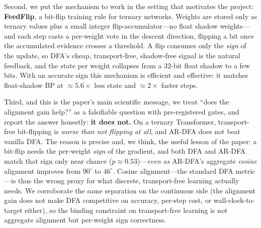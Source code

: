 \documentclass[11pt]{article}
\newcommand{\ARDFA}{\textsc{AR-DFA}}
\begin{document}
Second, we put the mechanism to work in the setting that motivates the project: \textbf{FeedFlip}, a bit-flip training rule for ternary networks. Weights are stored only as ternary values plus a small integer flip-accumulator---no float shadow weights---and each step casts a per-weight vote in the descent direction, flipping a bit once the accumulated evidence crosses a threshold. A flip consumes only the \emph{sign} of the update, so DFA's cheap, transport-free, shadow-free signal is the natural feedback, and the state per weight collapses from a $32$-bit float shadow to a few bits. With an accurate sign this mechanism is efficient and effective: it matches float-shadow BP at $\approx\!5.6\times$ less state and $\approx\!2\times$ faster steps.

Third, and this is the paper's main scientific message, we treat ``does the alignment gain help?'' as a falsifiable question with pre-registered gates, and report the answer honestly: \textbf{it does not.} On a ternary Transformer, transport-free bit-flipping is \emph{worse than not flipping at all}, and \ARDFA{} does not beat vanilla DFA. The reason is precise and, we think, the useful lesson of the paper: a bit-flip needs the per-weight \emph{sign} of the gradient, and both DFA and \ARDFA{} match that sign only near chance ($p\!\approx\!0.53$)---\emph{even as} \ARDFA{}'s aggregate \emph{cosine} alignment improves from $90^{\circ}$ to $46^{\circ}$. Cosine alignment---the standard DFA metric---is thus the wrong proxy for what discrete, transport-free learning actually needs. We corroborate the same separation on the continuous side (the alignment gain does not make DFA competitive on accuracy, per-step cost, or wall-clock-to-target either), so the binding constraint on transport-free learning is not aggregate alignment but per-weight sign correctness.
\end{document}
